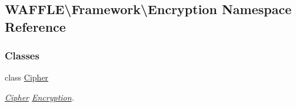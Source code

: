 \hypertarget{namespace_w_a_f_f_l_e_1_1_framework_1_1_encryption}{}\subsection{W\+A\+F\+F\+LE\textbackslash{}Framework\textbackslash{}Encryption Namespace Reference}
\label{namespace_w_a_f_f_l_e_1_1_framework_1_1_encryption}
\subsubsection*{Classes}
\begin{DoxyCompactItemize}
\item 
class \hyperlink{class_w_a_f_f_l_e_1_1_framework_1_1_encryption_1_1_cipher}{Cipher}
\begin{DoxyCompactList}\small\item\em \hyperlink{class_w_a_f_f_l_e_1_1_framework_1_1_encryption_1_1_cipher}{Cipher} \hyperlink{namespace_w_a_f_f_l_e_1_1_framework_1_1_encryption}{Encryption}. \end{DoxyCompactList}\end{DoxyCompactItemize}
